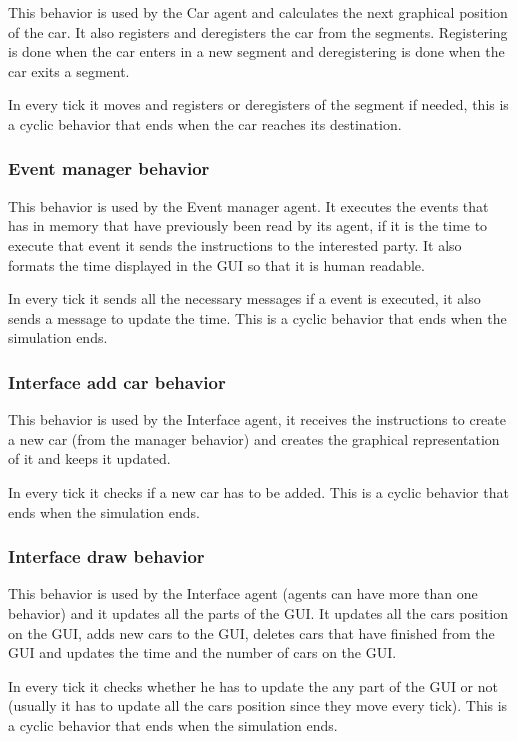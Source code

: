 This behavior is used by the Car agent and calculates the next graphical position of the car. It also registers and deregisters the car from the segments. Registering is done when the car enters in a new segment and deregistering is done when the car exits a segment.

In every tick it moves and registers or deregisters of the segment if needed, this is a cyclic behavior that ends when the car reaches its destination.

\subsubsection{Event manager behavior}

This behavior is used by the Event manager agent. It executes the events that has in memory that have previously been read by its agent, if it is the time to execute that event it sends the instructions to the interested party. It also formats the time displayed in the GUI so that it is human readable.

In every tick it sends all the necessary messages if a event is executed, it also sends a message to update the time. This is a cyclic behavior that ends when the simulation ends.

\subsubsection{Interface add car behavior}

This behavior is used by the Interface agent, it receives the instructions to create a new car (from the manager behavior) and creates the graphical representation of it and keeps it updated.

In every tick it checks if a new car has to be added. This is a cyclic behavior that ends when the simulation ends.

\subsubsection{Interface draw behavior}

This behavior is used by the Interface agent (agents can have more than one behavior) and it updates all the parts of the GUI. It updates all the cars position on the GUI, adds new cars to the GUI, deletes cars that have finished from the GUI and updates the time and the number of cars on the GUI.

In every tick it checks whether he has to update the any part of the GUI or not (usually it has to update all the cars position since they move every tick). This is a cyclic behavior that ends when the simulation ends.

